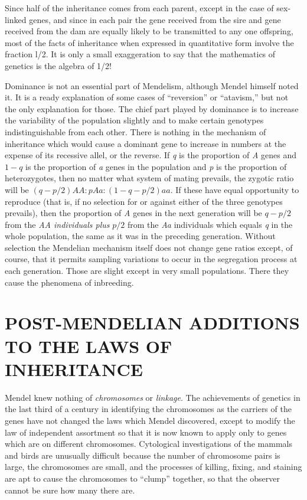 Since half of the inheritance comes from each parent, except in the
case of sex-linked genes, and since in each pair the gene received from
the sire and gene received from the dam are equally likely to be transmitted
to any one offspring, most of the facts of inheritance when
expressed in quantitative form involve the fraction l/2. It is only a
small exaggeration to say that the mathematics of genetics is the algebra
of 1/2!

Dominance is not an essential part of Mendelism, although Mendel
himself noted it. It is a ready explanation of some cases of ``reversion''
or ``atavism,'' but not the only explanation for those. The chief part
played by dominance is to increase the variability of the population
slightly and to make certain genotypes indistinguishable from each
other. There is nothing in the mechanism of inheritance which would
cause a dominant gene to increase in numbers at the expense of its
recessive allel, or the reverse. If \textit{q} is the proportion of \textit{A} genes and
$1 - q$ is the proportion of \textit{a} genes in the population and \textit{p} is the
proportion of heterozygotes, then no matter what system of mating prevails,
the zygotic ratio will be $(q - p/2)AA:p Aa: (1 - q - p/2) aa$.
If these have equal opportunity to reproduce (that is, if no selection for
or against either of the three genotypes prevails), then the proportion
of \textit{A} genes in the next generation will be $q - p/2$ from the \textit{AA individuals
plus} $p/2$ from the \textit{Aa} individuals which equals \textit{q} in the whole
population, the same as it was in the preceding generation. Without
selection the Mendelian mechanism itself does not change gene ratios
except, of course, that it permits sampling variations to occur in the
segregation process at each generation. Those are slight except in very
small populations. There they cause the phenomena of inbreeding.

\section*{POST-MENDELIAN ADDITIONS TO THE LAWS OF INHERITANCE}

Mendel knew nothing of \textit{chromosomes} or \textit{linkage}. The achievements
of genetics in the last third of a century in identifying the
chromosomes as the carriers of the genes have not changed the laws
which Mendel discovered, except to modify the law of independent
assortment so that it is now known to apply only to genes which are on
different chromosomes. Cytological investigations of the mammals and
birds are unusually difficult because the number of chromosome pairs
is large, the chromosomes are small, and the processes of killing, fixing,
and staining are apt to cause the chromosomes to ``clump'' together, so
that the observer cannot be sure how many there are.

